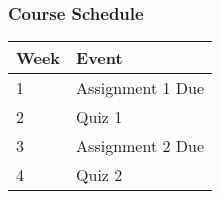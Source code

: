 \documentclass[a4paper,12pt]{article}
\begin{document}
\subsubsection*{Course Schedule}

\begin{tabular}{|l|l|}
\hline
Week & Event \\
\hline
1 & Assignment 1 Due \\
\hline
2 & Quiz 1 \\
\hline
3 & Assignment 2 Due \\
\hline
4 & Quiz 2 \\
\hline
\end{tabular}
\end{document}
